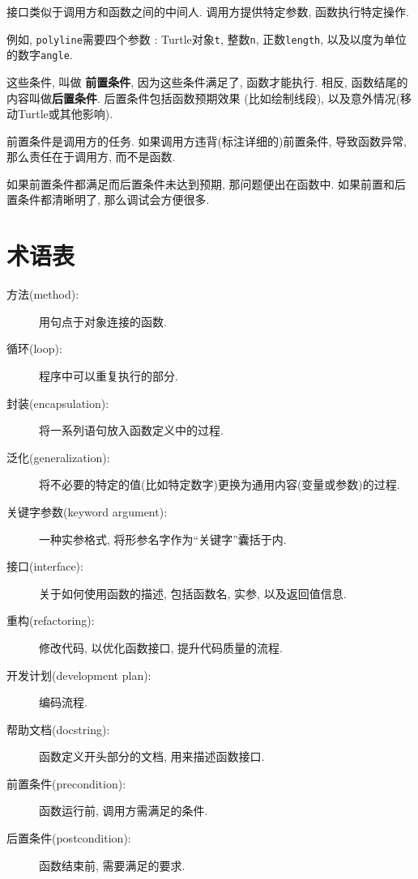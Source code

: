 \documentclass[10pt]{book}
\begin{document}
接口类似于调用方和函数之间的中间人. 
调用方提供特定参数, 函数执行特定操作. 

例如,  {\tt polyline}需要四个参数 : Turtle对象{\tt t},  整数{\tt n}, 
正数{\tt length},  以及以度为单位的数字{\tt angle}.

这些条件, 叫做 {\bf 前置条件},  因为这些条件满足了, 函数才能执行. 
相反, 函数结尾的内容叫做{\bf 后置条件}. 后置条件包括函数预期效果
(比如绘制线段),  以及意外情况(移动Turtle或其他影响).

前置条件是调用方的任务. 如果调用方违背(标注详细的)前置条件, 导致函数异常, 
那么责任在于调用方, 而不是函数. 

如果前置条件都满足而后置条件未达到预期, 那问题便出在函数中. 
如果前置和后置条件都清晰明了, 那么调试会方便很多. 

\section{术语表}

\begin{description}

\item[方法(method):] 用句点于对象连接的函数. 

\item[循环(loop):] 程序中可以重复执行的部分. 

\item[封装(encapsulation):] 将一系列语句放入函数定义中的过程. 

\item[泛化(generalization):] 将不必要的特定的值(比如特定数字)更换为通用内容(变量或参数)的过程. 

\item[关键字参数(keyword argument):] 一种实参格式, 将形参名字作为``关键字''囊括于内. 

\item[接口(interface):] 关于如何使用函数的描述, 包括函数名, 实参, 以及返回值信息. 

\item[重构(refactoring):] 修改代码, 以优化函数接口, 提升代码质量的流程.

\item[开发计划(development plan):] 编码流程.

\item[帮助文档(docstring):] 函数定义开头部分的文档, 用来描述函数接口. 

\item[前置条件(precondition):] 函数运行前, 调用方需满足的条件. 

\item[后置条件(postcondition):] 函数结束前, 需要满足的要求.

\end{description}
\end{document}
